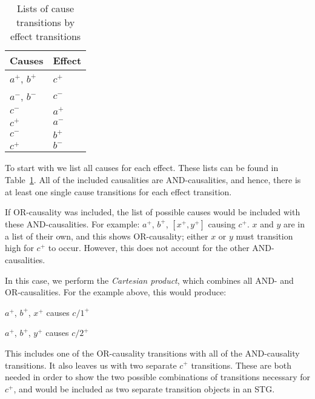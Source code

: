 \begin{table}[h]
\vspace{-2mm}
\caption{Lists of cause transitions by effect transitions
		\label{tab:list-of-concepts}}
  \centering
\begin{tabular}{@{}ll@{}}
	\toprule
	Causes & Effect\\ \midrule
	$a^{+}$, $b^{+}$	& $c^{+}$ \\
	$a^{-}$, $b^{-}$ 	& $c^{-}$ \\
	$c^{-}$			& $a^{+}$ \\
	$c^{+}$			& $a^{-}$ \\
	$c^{-}$			& $b^{+}$ \\
	$c^{+}$			& $b^{-}$ \\
	\bottomrule
\end{tabular}
\vspace{-5mm}
\end{table}

To start with we list all causes for each effect. 
These lists can be found in Table~\ref{tab:list-of-concepts}.
All of the included causalities are AND-causalities, and hence, there
is at least one single cause transitions for each effect transition. 

If OR-causality was included, the list of possible causes would be included with these
AND-causalities. For example:  $a^{+}$, $b^{+}$, $[x^{+}, y^{+}]$ causing
$c^{+}$. $x$ and $y$ are in a list of their own, and this shows OR-causality;
either $x$ or $y$ must transition high for $c^{+}$ to occur. However, this does
not account for the other AND-causalities. 

In this case, we perform the \emph{Cartesian product}, which combines
all AND- and OR-causalities. For the example above, this would produce:

\vspace{-2mm}

\begin{center}

$a^{+}$, $b^{+}$, $x^{+}$ causes $c/1^{+}$

$a^{+}$, $b^{+}$, $y^{+}$ causes $c/2^{+}$

\end{center}

\vspace{-2mm}

\noindent This includes one of the OR-causality transitions with all of the 
AND-causality transitions. It also leaves us with two separate $c^{+}$ 
transitions. These are both needed in order to show the two possible 
combinations of transitions necessary for $c^{+}$, and would be included as two
separate transition objects in an STG. 

